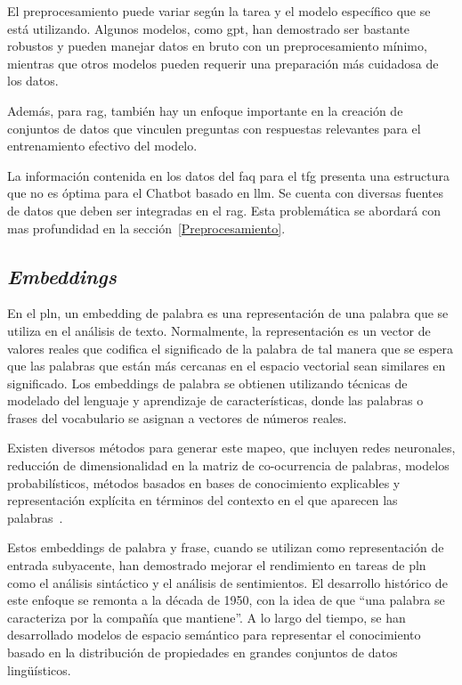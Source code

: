 El preprocesamiento puede variar según la tarea y el modelo específico que se está utilizando. Algunos modelos, como \acrfull{gpt}, han demostrado ser bastante robustos y pueden manejar datos en bruto con un preprocesamiento mínimo, mientras que otros modelos pueden requerir una preparación más cuidadosa de los datos. 

Además, para \acrshort{rag}, también hay un enfoque importante en la creación de conjuntos de datos que vinculen preguntas con respuestas relevantes para el entrenamiento efectivo del modelo. 

La información contenida en los datos del \acrshort{faq} para el \acrshort{tfg} presenta una estructura que no es óptima para el Chatbot basado en \acrshort{llm}. Se cuenta con diversas fuentes de datos que deben ser integradas en el \acrshort{rag}. Esta problemática se abordará con mas profundidad en la sección~\ref{Preprocesamiento}.

\subsection{\textit{Embeddings}}

En el \acrfull{pln}, un embedding de palabra es una representación de una palabra que se utiliza en el análisis de texto. Normalmente, la representación es un vector de valores reales que codifica el significado de la palabra de tal manera que se espera que las palabras que están más cercanas en el espacio vectorial sean similares en significado. Los embeddings de palabra se obtienen utilizando técnicas de modelado del lenguaje y aprendizaje de características, donde las palabras o frases del vocabulario se asignan a vectores de números reales.

Existen diversos métodos para generar este mapeo, que incluyen redes neuronales, reducción de dimensionalidad en la matriz de co-ocurrencia de palabras, modelos probabilísticos, métodos basados en bases de conocimiento explicables y representación explícita en términos del contexto en el que aparecen las palabras~\cite{mikolov2013distributed}.

Estos embeddings de palabra y frase, cuando se utilizan como representación de entrada subyacente, han demostrado mejorar el rendimiento en tareas de \acrshort{pln} como el análisis sintáctico y el análisis de sentimientos. El desarrollo histórico de este enfoque se remonta a la década de 1950, con la idea de que ``una palabra se caracteriza por la compañía que mantiene''. A lo largo del tiempo, se han desarrollado modelos de espacio semántico para representar el conocimiento basado en la distribución de propiedades en grandes conjuntos de datos lingüísticos.

